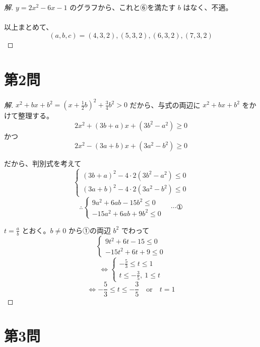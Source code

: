 \documentclass[../main.tex]{subfiles}
\begin{document}
\begin{proof}[解]
  $y = 2x^2 - 6x - 1$ のグラフから、これと⑥を満たす $b$ はなく、不適。

  \paragraph{}
  以上まとめて、
  \[
    (a,b,c) = (4,3,2), (5,3,2), (6,3,2), (7,3,2)
  \]
\end{proof}

\section*{第2問}

\begin{proof}[解]
  $x^2+bx+b^2 = \left(x + \frac{1}{2}b\right)^2 + \frac{3}{4}b^2 > 0$ だから、与式の両辺に $x^2+bx+b^2$ をかけて整理する。
  \[
    2x^2 + (3b+a)x + (3b^2-a^2) \ge 0
  \]
  かつ
  \[
    2x^2 - (3a+b)x + (3a^2-b^2) \ge 0
  \]

  だから、判別式を考えて
  \[
    \begin{cases}
      (3b+a)^2 - 4 \cdot 2 (3b^2-a^2) \le 0 \\
      (3a+b)^2 - 4 \cdot 2 (3a^2-b^2) \le 0
    \end{cases}
  \]
  \begin{equation}
    \therefore
    \begin{cases}
      9a^2 + 6ab - 15b^2 \le 0 \\
      -15a^2 + 6ab + 9b^2 \le 0
    \end{cases} \quad \cdots \text{①}
  \end{equation}

  $t = \frac{a}{b}$ とおく。$b \neq 0$ から①の両辺 $b^2$ でわって
  \[
    \begin{cases}
      9t^2 + 6t - 15 \le 0 \\
      -15t^2 + 6t + 9 \le 0
    \end{cases}
  \]
  \[
    \iff
    \begin{cases}
      -\frac{5}{3} \le t \le 1 \\
      t \le -\frac{3}{5}, \ 1 \le t
    \end{cases}
  \]
  \[
    \iff -\frac{5}{3} \le t \le -\frac{3}{5} \quad \text{or} \quad t = 1
  \]
\end{proof}

\section*{第3問}
\end{document}
